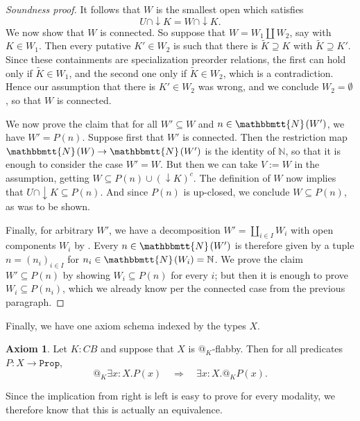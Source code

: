 \documentclass[11pt, oneside, article]{memoir}
\makeatletter
\theoremstyle{plain}
\theoremstyle{definition}
\newtheorem{axiom}{Axiom}
\theoremstyle{remark}
\newenvironment{soundproof}{\begin{proof}[Soundness proof]}{\end{proof}}
\newcommand{\const}[1]{\mathtt{#1}}
\newcommand{\wt}[1]{\widetilde{#1}}
\newcommand{\internal}[1]{\raisebox{-.03ex}{$\mathbbmtt{#1}$}}
\newcommand{\hs}{\hspace{1.1pt}}
\newcommand{\NN}{\mathbb{N}}
\newcommand{\tNN}{\internal{N}\hs}
\newcommand{\Prop}{\const{Prop}}
\newcommand{\BaseSpace}{B}
\newcommand{\CB}{C\BaseSpace}
\newcommand{\AtSymbol}{{@}}
\newcommand{\At}[2][]{\AtSymbol^{#1}_{#2}}
\makeatother
\begin{document}
\begin{soundproof}
	It follows that $W$ is the smallest open which satisfies 
	\begin{equation}
		\label{UKW}
		U \cap \downarrow K = W \cap \downarrow K.
	\end{equation}
	We now show that $W$ is connected. So suppose that $W = W_1 \amalg W_2$, say with $K\in W_1$. Then every putative $K' \in W_2$ is such that there is $\wt{K} \supseteq K$ with $\wt{K} \supseteq K'$. Since these containments are specialization preorder relations, the first can hold only if $\wt{K} \in W_1$, and the second one only if $\wt{K} \in W_2$, which is a contradiction. Hence our assumption that there is $K' \in W_2$ was wrong, and we conclude $W_2 = \emptyset$, so that $W$ is connected.

	We now prove the claim that for all $W' \subseteq W$ and $n \in \tNN(W')$, we have $W' = P(n)$. Suppose first that $W'$ is connected. Then the restriction map $\tNN(W) \to \tNN(W')$ is the identity of $\NN$, so that it is enough to consider the case $W' = W$. But then we can take $V := W$ in the assumption, getting $W \subseteq P(n) \cup (\downarrow K)^c$. The definition of $W$ now implies that $U \cap \downarrow K \subseteq P(n)$. And since $P(n)$ is up-closed, we conclude $W \subseteq P(n)$, as was to be shown.

	Finally, for arbitrary $W'$, we have a decomposition $W' = \coprod_{i\in I} W_i$ with open components $W_i$ by . Every $n \in \tNN(W')$ is therefore given by a tuple $n = (n_i)_{i\in I}$ for $n_i \in \tNN(W_i) = \NN$. We prove the claim $W' \subseteq P(n)$ by showing $W_i \subseteq P(n)$ for every $i$; but then it is enough to prove $W_i \subseteq P(n_i)$, which we already know per the connected case from the previous paragraph.
\end{soundproof}

Finally, we have one axiom schema indexed by the types $X$.

\begin{axiom}
	\label{ax:flabby_vs_at}
	Let $K : \CB$ and suppose that $X$ is $\At{K}$-flabby. Then for all predicates $P : X \to \Prop$,
	\[
		\At{K}\exists x:X. P(x) \quad \Longrightarrow \quad \exists x:X.\At{K}P(x).
	\]
\end{axiom}

Since the implication from right is left is easy to prove for every modality, we therefore know that this is actually an equivalence.
\end{document}
